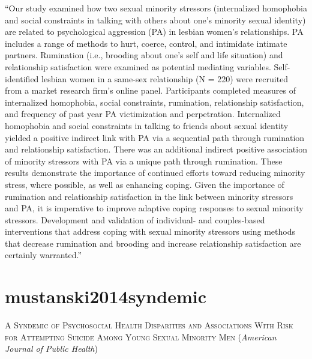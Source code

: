 \documentclass[]{tufte-handout}
\begin{document}
``Our study examined how two sexual minority stressors (internalized
homophobia and social constraints in talking with others about one's
minority sexual identity) are related to psychological aggression (PA)
in lesbian women's relationships. PA includes a range of methods to
hurt, coerce, control, and intimidate intimate partners. Rumination
(i.e., brooding about one's self and life situation) and relationship
satisfaction were examined as potential mediating variables.
Self-identified lesbian women in a same-sex relationship (N = 220) were
recruited from a market research firm's online panel. Participants
completed measures of internalized homophobia, social constraints,
rumination, relationship satisfaction, and frequency of past year PA
victimization and perpetration. Internalized homophobia and social
constraints in talking to friends about sexual identity yielded a
positive indirect link with PA via a sequential path through rumination
and relationship satisfaction. There was an additional indirect positive
association of minority stressors with PA via a unique path through
rumination. These results demonstrate the importance of continued
efforts toward reducing minority stress, where possible, as well as
enhancing coping. Given the importance of rumination and relationship
satisfaction in the link between minority stressors and PA, it is
imperative to improve adaptive coping responses to sexual minority
stressors. Development and validation of individual- and couples-based
interventions that address coping with sexual minority stressors using
methods that decrease rumination and brooding and increase relationship
satisfaction are certainly warranted.''

\section{\texorpdfstring{\textcolor[HTML]{5b0057}{mustanski2014syndemic}}{}}\label{section-54}

\textsc{\large{A Syndemic of Psychosocial Health Disparities and Associations With Risk for Attempting Suicide Among Young Sexual Minority Men}}
(\emph{American Journal of Public Health})
\end{document}
